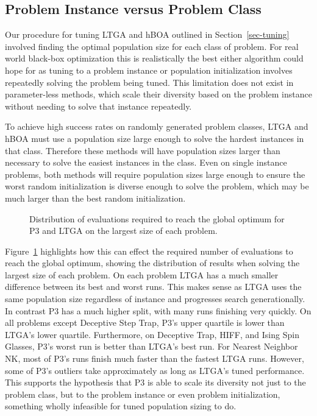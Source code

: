 \subsection{Problem Instance versus Problem Class}
Our procedure for tuning LTGA and hBOA outlined in Section~\ref{sec-tuning} involved finding
the optimal population size for each class of problem. For real world black-box optimization this is
realistically the best either algorithm could hope for as tuning to a problem
instance or population initialization involves repeatedly solving the problem being tuned.
This limitation does not exist in parameter-less methods, which scale their diversity
based on the problem instance without needing to solve that instance repeatedly.

To achieve high success rates on randomly generated problem classes, LTGA and hBOA must use a population size
large enough to solve the hardest instances in that class. Therefore these methods will have
population sizes larger than necessary to solve the easiest instances in the class. Even
on single instance problems, both methods will require population sizes large enough to
ensure the worst random initialization is diverse enough to solve the problem, which may be
much larger than the best random initialization.

\begin{figure}
  \begin{center}
  \end{center}
  \caption{Distribution of evaluations required to reach the global optimum for
           P3 and LTGA on the largest size of each problem.}
  \label{fig-evals-to-success-boxplot}
\end{figure}


Figure~\ref{fig-evals-to-success-boxplot}
highlights how this can effect the required number of evaluations to reach the global optimum, showing
the distribution of results when solving the largest size of each problem. On each problem
LTGA has a much smaller difference between its best and worst runs. This makes sense as LTGA uses the same
population size regardless of instance and progresses search generationally. In contrast P3 has a much
higher split, with many runs finishing very quickly.
On all problems except Deceptive Step Trap, P3's upper quartile is lower than LTGA's lower quartile.
Furthermore, on Deceptive Trap, HIFF, and Ising Spin Glasses, P3's worst run is better than LTGA's best run.
For Nearest Neighbor NK, most of P3's runs finish much faster than the fastest LTGA runs. However, some
of P3's outliers take approximately as long as LTGA's tuned performance.
This supports the hypothesis that P3 is able to scale its diversity not just
to the problem class, but to the problem instance or even problem initialization, something
wholly infeasible for tuned population sizing to do.

